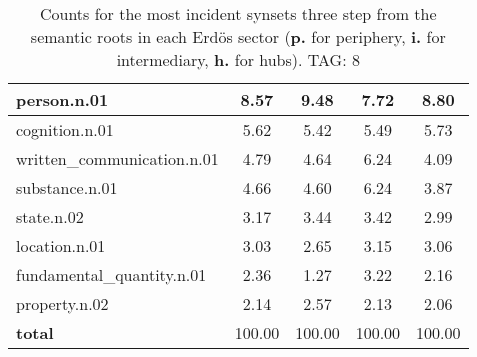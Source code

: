 \begin{table}[h!]
\begin{center}
\begin{tabular}{| l || c | c | c | c |}
person.n.01 & 8.57  & 9.48  & 7.72  & 8.80 \\\hline
cognition.n.01 & 5.62  & 5.42  & 5.49  & 5.73 \\\hline
written\_communication.n.01 & 4.79  & 4.64  & 6.24  & 4.09 \\\hline
substance.n.01 & 4.66  & 4.60  & 6.24  & 3.87 \\\hline
state.n.02 & 3.17  & 3.44  & 3.42  & 2.99 \\\hline
location.n.01 & 3.03  & 2.65  & 3.15  & 3.06 \\\hline
fundamental\_quantity.n.01 & 2.36  & 1.27  & 3.22  & 2.16 \\\hline
property.n.02 & 2.14  & 2.57  & 2.13  & 2.06 \\\hline\hline
{{\bf total}} & 100.00  & 100.00  & 100.00  & 100.00 \\\hline
\end{tabular}
\caption{Counts for the most incident synsets three step from the semantic roots in each Erd\"os sector ({\bf p.} for periphery, {\bf i.} for intermediary, {\bf h.} for hubs). TAG: 8}
\end{center}
\end{table}